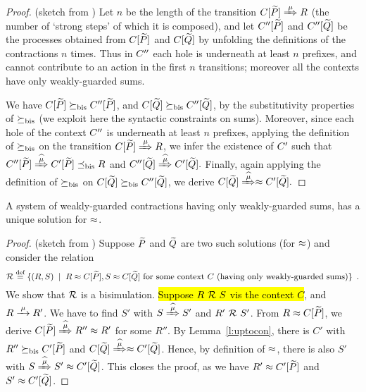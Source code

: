 \begin{proof}{(sketch from \cite{sangiorgi2017equations})}
Let $n$ be the length of the transition $\ct{\til P}\Arr\mu R$  (the
number of `strong steps' of which it is composed), and  
let $C'' [\widetilde P]$ and $C'' [\widetilde Q]$  be the processes obtained
from  $C [\widetilde P]$ and $C [\widetilde Q]$ by unfolding the definitions
of the contractions $n$ times. Thus in $C''$ each hole is
underneath at least $n$ prefixes, and cannot contribute to an action
in the first $n$ transitions; moreover all the contexts have only
weakly-guarded sums.

We have $C [\widetilde P] \mathrel{\succeq_{\rm{bis}}} C'' [\widetilde P]$, and 
$C [\widetilde Q] \mathrel{\succeq_{\rm{bis}}} C'' [\widetilde Q]$, 
 by the substitutivity  properties of $\mathrel{\succeq_{\rm{bis}}}$ (we exploit here
 the syntactic constraints on sums). Moreover,
 since each hole of the  context $C''$ is underneath at least $n$
 prefixes, applying  
the definition
 of $ \mathrel{\succeq_{\rm{bis}}}$ on the transition 
 $\ct{\til P}\Arr{\mu}  R$, we infer the existence
 of $C'$ such that 
$
\ctpp{\til P}\Arcap{\mu} \ctp{\til P} \mexpaBIS R
$
and 
$
\ctpp{\til Q}\Arcap{\mu}  \ctp{\til Q} 
. $
Finally, again applying the definition of $\mathrel{\succeq_{\rm{bis}}}$ on 
$C [\widetilde Q] \mathrel{\succeq_{\rm{bis}}} C'' [\widetilde Q]$, 
we derive 
$
\ct{\til Q}\Arcap{\mu}  \wb \ctp{\til Q} 
.$
\end{proof}

\begin{theorem}
\label{t:contraBisimulationU}
A system of weakly-guarded contractions
having only weakly-guarded sums, has a unique solution for $\approx$.
\end{theorem}

\begin{proof}{(sketch from \cite{sangiorgi2017equations})}
Suppose $\widetilde P$ and $\widetilde Q$ are two such solutions (for $\approx$) and consider
the relation
\begin{equation}
\label{eq:R}
{\cal R} \stackrel{\mbox{\scriptsize def}}{=} \{ 
(R,S) \; \mid \; R \approx C [\widetilde P], S \approx C [\widetilde Q] \mbox{ for some context
$C$ (having only weakly-guarded sums)} \} \enspace.
\end{equation}
We show that ${\cal R}$ is a bisimulation. \hl{Suppose $R\ {\cal R}\ S$ vis the context
$C$}, and $R \arr{\mu} R'$. We have to find $S'$ with $S \Arcap{\mu}
S'$ and $R'\ {\cal R}\ S'$. From $R \approx C[{\widetilde P}]$, we derive $C[{\til P}]
\Arcap{\mu} R'' \wb R'$ for some $R''$. By Lemma~\ref{l:uptocon},
there is $C'$ with $R'' \mathrel{\succeq_{\rm{bis}}} C'[{\widetilde P}]$ and $C[{\til Q}]
\Arcap{\mu} \wb C'[{\til Q}]$. Hence, by definition of $\approx$, there is
also $S'$ with $S \Arcap{\mu} S' \wb C'[{\til Q}]$. This closes the
proof, as we have $R' \approx C'[{\widetilde P}]$ and $S' \approx C'[{\widetilde Q}]$.
\end{proof}

